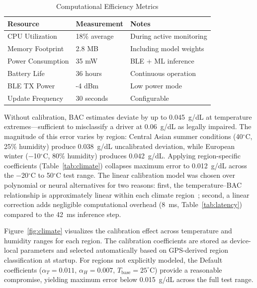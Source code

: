 \documentclass[HARVARD,Times2COL]{WileyNJDv5}
\begin{document}
\begin{table}[htbp]
\caption{Computational Efficiency Metrics}
\label{tab:efficiency}
\centering
\small
\begin{tabular}{@{}lll@{}}
\toprule
\textbf{Resource} & \textbf{Measurement} & \textbf{Notes} \\
\midrule
CPU Utilization & 18\% average & During active monitoring \\
Memory Footprint & 2.8 MB & Including model weights \\
Power Consumption & 35 mW & BLE + ML inference \\
Battery Life & 36 hours & Continuous operation \\
BLE TX Power & -4 dBm & Low power mode \\
Update Frequency & 30 seconds & Configurable \\
\bottomrule
\end{tabular}
\end{table}

Without calibration, BAC estimates deviate by up to 0.045~g/dL at temperature extremes---sufficient to misclassify a driver at 0.06~g/dL as legally impaired. The magnitude of this error varies by region: Central Asian summer conditions (40$^\circ$C, 25\% humidity) produce 0.038~g/dL uncalibrated deviation, while European winter ($-$10$^\circ$C, 80\% humidity) produces 0.042~g/dL. Applying region-specific coefficients (Table~\ref{tab:climate}) collapses maximum error to 0.012~g/dL across the $-$20$^\circ$C to 50$^\circ$C test range. The linear calibration model was chosen over polynomial or neural alternatives for two reasons: first, the temperature--BAC relationship is approximately linear within each climate region~\citep{fairbairn2021}; second, a linear correction adds negligible computational overhead (8~ms, Table~\ref{tab:latency}) compared to the 42~ms inference step.

Figure~\ref{fig:climate} visualizes the calibration effect across temperature and humidity ranges for each region. The calibration coefficients are stored as device-local parameters and selected automatically based on GPS-derived region classification at startup. For regions not explicitly modeled, the Default coefficients ($\alpha_T = 0.011$, $\alpha_H = 0.007$, $T_{\text{base}} = 25^\circ$C) provide a reasonable compromise, yielding maximum error below 0.015~g/dL across the full test range.
\end{document}
